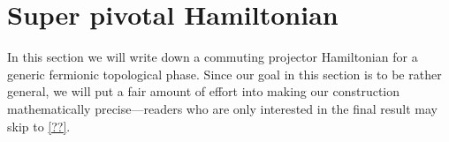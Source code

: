 \documentclass[12pt,a4paper]{article}
\newcommand{\tp}{\otimes}
\newcommand{\dave}[1]{{\color{ao(english)}\footnotesize{(DA) #1}}}
\newcommand{\kw}[1]{{\color{kwcolor}\footnotesize{(KW) #1}}}
\begin{document}

 \section{Super pivotal Hamiltonian}
 \label{Super_pivotal_Hamiltonian}

In this section we will write down a commuting projector Hamiltonian 
for a generic fermionic topological phase. 
Since our goal in this section is to be rather general, we will put a fair amount of effort into making our construction mathematically precise---readers who are only interested in the final result may skip to \ref{??}. 
\end{document}
